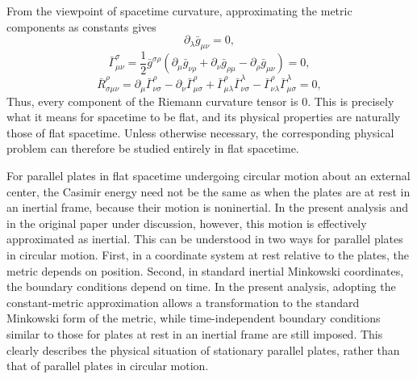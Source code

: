 \documentclass[english]{article}
\begin{document}
From the viewpoint of spacetime curvature, approximating the metric
components as constants gives 
\[
\partial_{\lambda}\bar{g}_{\mu\nu}=0,
\]
 {}
\[
\bar{\Gamma}^{\sigma}_{\!\mu\nu}=\frac{1}{2}\bar{g}^{\sigma\rho}\left(\partial_{\mu}\bar{g}_{\nu\rho}+\partial_{\nu}\bar{g}_{\rho\mu}-\partial_{\rho}\bar{g}_{\mu\nu}\right)=0,
\]
 {}
\[
\bar{R}^{\rho}_{\!\sigma\mu\nu}=\partial_{\mu}\bar{\Gamma}^{\rho}_{\!\nu\sigma}-\partial_{\nu}\bar{\Gamma}^{\rho}_{\!\mu\sigma}+\bar{\Gamma}^{\rho}_{\!\mu\lambda}\bar{\Gamma}^{\lambda}_{\!\nu\sigma}-\bar{\Gamma}^{\rho}_{\!\nu\lambda}\bar{\Gamma}^{\lambda}_{\!\mu\sigma}=0,
\]
 Thus, every component of the Riemann curvature tensor is $0$. This
is precisely what it means for spacetime to be flat, and its physical
properties are naturally those of flat spacetime. Unless otherwise
necessary, the corresponding physical problem can therefore be studied
entirely in flat spacetime.

For parallel plates in flat spacetime undergoing circular motion about
an external center, the Casimir energy need not be the same as when
the plates are at rest in an inertial frame, because their motion
is noninertial. In the present analysis and in the original paper
under discussion, however, this motion is effectively approximated
as inertial. This can be understood in two ways for parallel plates
in circular motion. First, in a coordinate system at rest relative
to the plates, the metric depends on position. Second, in standard
inertial Minkowski coordinates, the boundary conditions depend on
time. In the present analysis, adopting the constant-metric approximation
allows a transformation to the standard Minkowski form of the metric,
while time-independent boundary conditions similar to those for plates
at rest in an inertial frame are still imposed. This clearly describes
the physical situation of stationary parallel plates, rather than
that of parallel plates in circular motion.
\end{document}
